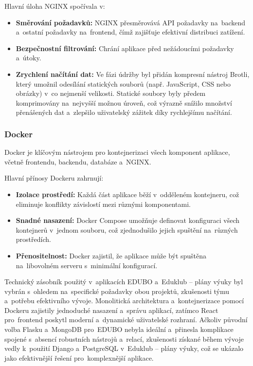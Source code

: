 \documentclass[male,czech,api_bc]{kitheses}
\begin{document}
Hlavní úloha NGINX spočívala v:
\begin{itemize}
	\item \textbf{Směrování požadavků:} NGINX přesměrovává API požadavky na~backend a~ostatní požadavky na~frontend, čímž zajišťuje efektivní distribuci zatížení.
	\item \textbf{Bezpečnostní filtrování:} Chrání aplikace před nežádoucími požadavky a~útoky.
	\item \textbf{Zrychlení načítání dat:} Ve fázi údržby byl přidán kompresní nástroj Brotli, který umožnil odesílání statických souborů (např. JavaScript, CSS nebo obrázky) v~co nejmenší velikosti. Statické soubory byly předem komprimovány na~nejvyšší možnou úroveň, což výrazně snížilo množství přenášených dat a~zlepšilo uživatelský zážitek díky rychlejšímu načítání.
\end{itemize}

\subsubsection{Docker}

Docker je klíčovým nástrojem pro kontejnerizaci všech komponent aplikace, včetně frontendu, backendu, databáze a~NGINX.

Hlavní přínosy Dockeru zahrnují:
\begin{itemize}
	\item \textbf{Izolace prostředí:} Každá část aplikace běží v~odděleném kontejneru, což eliminuje konflikty závislostí mezi různými komponentami.
	\item \textbf{Snadné nasazení:} Docker Compose umožňuje definovat konfiguraci všech kontejnerů v~jednom souboru, což zjednodušilo jejich spuštění na~různých prostředích.
	\item \textbf{Přenositelnost:} Docker zajistil, že aplikace může být spuštěna na~libovolném serveru s~minimální konfigurací.
\end{itemize}

Technický zásobník použitý v~aplikacích EDUBO a~Eduklub – plány výuky byl vybrán s~ohledem na~specifické požadavky obou projektů, zkušenosti týmu a~potřebu efektivního vývoje. Monolitická architektura a~kontejnerizace pomocí Dockeru zajistily jednoduché nasazení a~správu aplikací, zatímco React pro~frontend poskytl moderní a~dynamické uživatelské rozhraní. Ačkoliv původní volba Flasku a~MongoDB pro~EDUBO nebyla ideální a~přinesla komplikace spojené s~absencí robustních nástrojů a~relací, zkušenosti získané během vývoje vedly k~použití Django a~PostgreSQL v~Eduklub – plány výuky, což se ukázalo jako efektivnější řešení pro~komplexnější aplikace.
\end{document}
